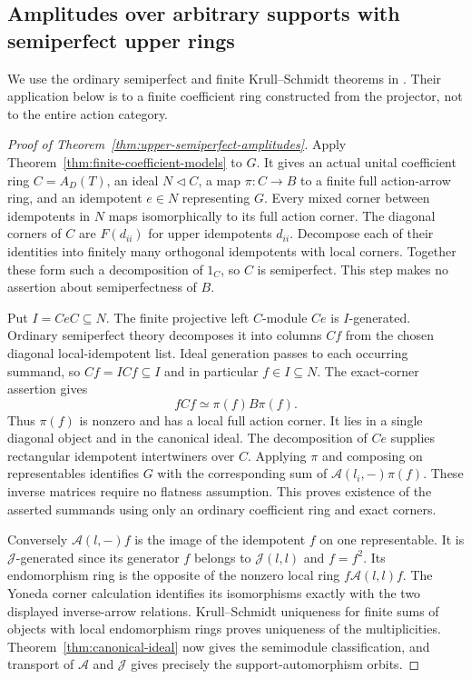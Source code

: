 \subsection{Amplitudes over arbitrary supports with semiperfect upper rings}
We use the ordinary semiperfect and finite Krull--Schmidt theorems
in \cite[Proposition~4.1, pp.~8--9, Theorem~4.2 and Corollary~4.3,
p.~9 of the author preprint]{Krause}. Their application below is to
a finite coefficient ring constructed from the projector, not to
the entire action category.

\begin{proof}[Proof of Theorem~\ref{thm:upper-semiperfect-amplitudes}]
Apply Theorem~\ref{thm:finite-coefficient-models} to $G$. It gives
an actual unital coefficient ring $C=A_D(T)$, an ideal $N\lhd C$,
a map $\pi:C\to B$ to a finite full action-arrow ring, and an
idempotent $e\in N$ representing $G$. Every mixed corner between
idempotents in $N$ maps isomorphically to its full action corner.
The diagonal corners of $C$ are $F(d_{ii})$ for upper idempotents
$d_{ii}$. Decompose each of their identities into finitely many
orthogonal idempotents with local corners. Together these form
such a decomposition of $1_C$, so $C$ is semiperfect. This step
makes no assertion about semiperfectness of $B$.

Put $I=CeC\subseteq N$. The finite projective left $C$-module
$Ce$ is $I$-generated. Ordinary semiperfect theory decomposes it
into columns $Cf$ from the chosen diagonal local-idempotent list.
Ideal generation passes to each occurring summand, so
$Cf=ICf\subseteq I$ and in particular $f\in I\subseteq N$.
The exact-corner assertion gives
\[
 fCf\simeq\pi(f)B\pi(f).
\]
Thus $\pi(f)$ is nonzero and has a local full action corner.
It lies in a single diagonal object and in the canonical ideal.
The decomposition of $Ce$ supplies rectangular idempotent
intertwiners over $C$. Applying $\pi$ and composing on
representables identifies $G$ with the corresponding sum of
$\mathcal A(l_i,-)\pi(f)$. These inverse matrices require no
flatness assumption. This proves existence of the asserted
summands using only an ordinary coefficient ring and exact
corners.

Conversely $\mathcal A(l,-)f$ is the image of the idempotent $f$
on one representable. It is $\mathcal J$-generated since its
generator $f$ belongs to $\mathcal J(l,l)$ and $f=f^2$.
Its endomorphism ring is the opposite of the nonzero local ring
$f\mathcal A(l,l)f$. The Yoneda corner calculation identifies its
isomorphisms exactly with the two displayed inverse-arrow
relations. Krull--Schmidt uniqueness for finite sums of objects
with local endomorphism rings proves uniqueness of the
multiplicities. Theorem~\ref{thm:canonical-ideal} now gives the
semimodule classification, and transport of $\mathcal A$ and
$\mathcal J$ gives precisely the support-automorphism orbits.


\end{proof}
